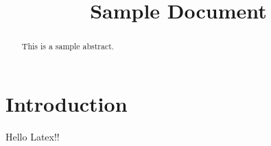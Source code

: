 \documentclass[conference]{IEEEtran}
\begin{document}
\title{Sample Document}
\author{
}

\maketitle

\begin{abstract}
This is a sample abstract.
\end{abstract}

\section{Introduction}
Hello Latex!!
\end{document}
